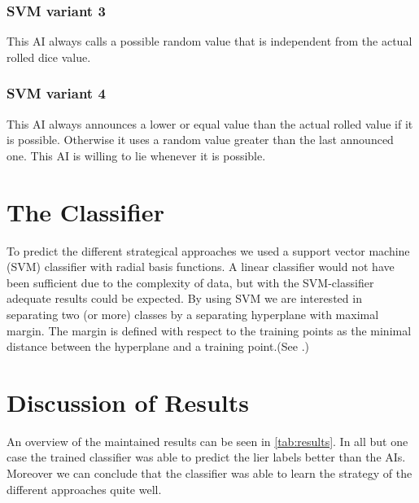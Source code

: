 \documentclass[11pt]{article}
\begin{document}
\subsubsection{SVM variant 3}
\label{sssec:svm3}
This AI always calls a possible random value that is independent from the actual rolled dice value.

\subsubsection{SVM variant 4}
\label{sssec:svm4}
This AI always announces a lower or equal value than the actual rolled value if it is possible. Otherwise it uses a random value greater than the last announced one. This AI is willing to lie whenever it is possible. 

\section{The Classifier}
\label{sec:predictor}
To predict the different strategical approaches we used a support vector machine (SVM) classifier with radial basis functions. A linear classifier would not have been sufficient due to the complexity of data, but with the SVM-classifier adequate results could be expected.
By using SVM we are interested in separating two (or more) classes by a separating hyperplane with maximal margin. The margin is defined with respect to the training points as the minimal distance between the hyperplane and a training point.(See \cite[187--227]{Schoellkopf:02}.)

\section{Discussion of Results}
\label{secDiscussionOfResults}
An overview of the maintained results can be seen in \cref{tab:results}.
In all but one case the trained classifier was able to predict the lier labels better than the AIs. Moreover we can conclude that the classifier was able to learn the strategy of the different approaches quite well. 
\end{document}
